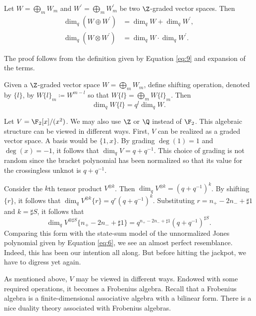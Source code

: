 \begin{proposition}
\label{sec:cohom-groups-mathc-12}
Let $W = \bigoplus_m W_m$ and $W^{\prime} = \bigoplus_m W_m^{\prime}$ be two $\Z$-graded vector spaces. Then 
\begin{align}
\label{eq:1}
  \dim_q (W \oplus W^{\prime}) &= \dim_q W + \dim_q W^{\prime}, \\
\label{eq:2}
  \dim_q (W \otimes W^{\prime}) &= \dim_q W \cdot \dim_q W^{\prime}.
\end{align}
\end{proposition}

The proof follows from the definition given by Equation \ref{eq:9} and expansion of the terms. 

\begin{proposition}
\label{sec:cohom-groups-mathc-13}
Given a $\Z$-graded vector space $W = \bigoplus_{m} W_m$, define shifting operation, denoted by $\{l\}$, by $W\{l\}_m \coloneqq W^{m-l}$ so that $W\{l\} = \bigoplus_m W\{l\}_m$. Then 
\begin{equation}
\label{eq:10}
\dim_qW\{l\} = q^l \dim_q W.
\end{equation}
\end{proposition}

Let $V = \F_2[x]/(x^2)$. We may also use $\Z$ or $\Q$ instead of $\F_2$. This algebraic structure can be viewed in different ways. First, $V$ can be realized as a graded vector space. A basis would be $\{1, x\}$. By grading  $\deg(1) = 1$ and $\deg(x) = -1$, it follows that $\dim_q V = q + q^{-1}$. This choice of grading is not random since the bracket polynomial has been normalized so that its value for the crossingless unknot is $q+q^{-1}$.

Consider the $k$th tensor product $V^{\otimes k}$. Then $\dim_q V^{\otimes k} = (q + q^{-1})^k$. By shifting $\{r\}$, it follows that $\dim_q V^{\otimes k}\{r\} = q^r (q + q^{-1})^k$. Substituting $r = n_+ - 2n_- + \sharp 1$ and $k = \sharp S$, it follows that 
\begin{equation}
\label{eq:11}
\dim_q V^{\otimes \sharp S} \{ n_+ - 2n_- + \sharp 1 \} = q^{n_+ - 2n_- + \sharp 1} (q + q^{-1})^{\sharp S}.
\end{equation}
Comparing this form with the state-sum model of the unnormalized Jones polynomial given by Equation \ref{eq:6}, we see an almost perfect resemblance. Indeed, this has been our intention all along. But before hitting the jackpot, we have to digress yet again.

As mentioned above, $V$ may be viewed in different ways. Endowed with some required operations, it becomes a Frobenius algebra. Recall that a Frobenius algebra is a finite-dimensional associative algebra with a bilinear form.
There is a nice duality theory associated with Frobenius algebras.

